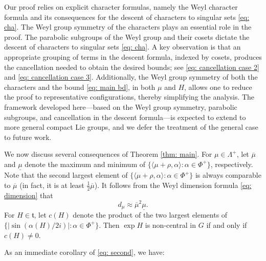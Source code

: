 \documentclass{amsart}
\numberwithin{equation}{section}
\numberwithin{equation}{section}
\begin{document}
Our proof relies on explicit character formulas, namely the Weyl character formula and its consequences for the descent of characters to singular sets \eqref{eq: cha}. The Weyl group symmetry of the characters plays an essential role in the proof. 
The parabolic subgroups of the Weyl group and their cosets dictate the descent of characters to singular sets \eqref{eq: cha}. A key observation is that an appropriate grouping of terms in the descent formula, indexed by cosets, produces the cancellation needed to obtain the desired bounds; see \eqref{eq: cancellation case 2} and \eqref{eq: cancellation case 3}. Additionally, the Weyl group symmetry of both the characters and the bound \eqref{eq: main bd}, in both $\mu$ and $H$, allows one to reduce the proof to representative configurations, thereby simplifying the analysis. The framework developed here---based on the Weyl group symmetry, parabolic subgroups, and cancellation in the descent formula---is expected to extend to more general compact Lie groups, and we defer the treatment of the general case to future work.

We now discuss several consequences of Theorem \ref{thm: main}. 
For $\mu\in\Lambda^+$, let $\overline{\mu}$ and $\underline{\mu}$ denote the maximum and minimum of 
$\{\langle \mu+\rho,\alpha\rangle : \alpha \in \Phi^+\}$, respectively. Note that the second largest element of 
$\{\langle \mu+\rho,\alpha\rangle: \alpha \in \Phi^+\}$ 
is always comparable to $\overline{\mu}$ (in fact, it is at least $\tfrac{1}{2}\overline{\mu}$). It follows from the Weyl dimension formula \eqref{eq: dimension} that
\[
d_\mu \approx \overline{\mu}^2\underline{\mu}.
\]
For $H\in\mathfrak{t}$, let $c(H)$ denote 
the product of the two largest elements of 
$\{|\sin(\alpha(H)/2i)|:\alpha\in\Phi^+\}$. Then $\exp H$ is non-central in $G$ if and only if $c(H)\neq 0$. 




As an immediate corollary of \eqref{eq: second}, we have:
\end{document}

